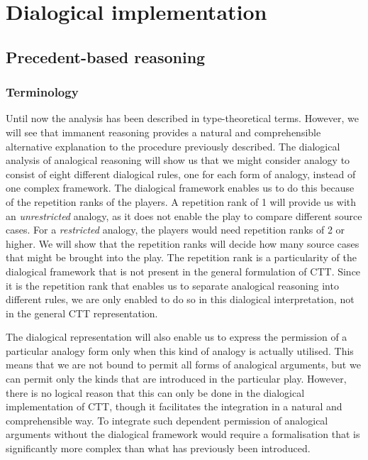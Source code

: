 \chapter{Dialogical implementation}\label{Sec:DialogicalImplementation}
	
	\section{Precedent-based reasoning}
	
		\subsection{Terminology}
	
		Until now the analysis has been described in type-theoretical terms. However, we will see that immanent reasoning provides a natural and comprehensible alternative explanation to the procedure previously described. The dialogical analysis of analogical reasoning will show us that we might consider analogy to consist of eight different dialogical rules, one for each form of analogy, instead of one complex framework. The dialogical framework enables us to do this because of the repetition ranks of the players. A repetition rank of 1 will provide us with an \textit{unrestricted} analogy, as it does not enable the play to compare different source cases. For a \textit{restricted} analogy, the players would need repetition ranks of 2 or higher. We will show that the repetition ranks will decide how many source cases that might be brought into the play. The repetition rank is a particularity of the dialogical framework that is not present in the general formulation of CTT. Since it is the repetition rank that enables us to separate analogical reasoning into different rules, we are only enabled to do so in this dialogical interpretation, not in the general CTT representation.
		
		The dialogical representation will also enable us to express the permission of a particular analogy form only when this kind of analogy is actually utilised. This means that we are not bound to permit all forms of analogical arguments, but we can permit only the kinds that are introduced in the particular play. However, there is no logical reason that this can only be done in the dialogical implementation of CTT, though it facilitates the integration in a natural and comprehensible way. To integrate such dependent permission of analogical arguments without the dialogical framework would require a formalisation that is significantly more complex than what has previously been introduced. 
		
